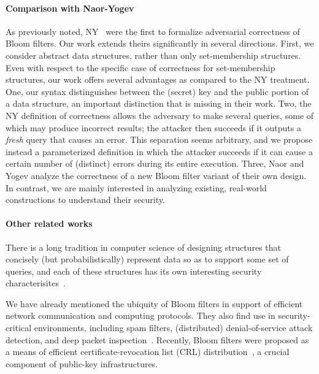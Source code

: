 \paragraph{Comparison with Naor-Yogev}
As previously noted, NY~\cite{naor2015bloom} were the first to
formalize adversarial correctness of Bloom filters.  Our work extends theirs
significantly in several directions. First, we consider abstract data
structures, rather than only set-membership structures.  Even with respect to
the specific case of correctness for set-membership structures, our work offers
several advantages as compared to the NY treatment.
%
One, our syntax distinguishes between the (secret) key and the public portion of
a data structure, an important distinction that is missing in their work.
%
Two, the NY definition of correctness allows the adversary to make
several queries, some of which may produce incorrect results; the attacker then
succeeds if it outputs a \emph{fresh} query that causes an error. This
separation seems arbitrary, and we propose instead a parameterized definition in
which the attacker succeeds if it can cause a certain number of (distinct)
errors during its entire execution.
%
Three, Naor and Yogev analyze the correctness of a new Bloom filter variant of
their own design. In contrast, we are mainly interested in analyzing existing,
real-world constructions to understand their security.

\paragraph{Other related works}
There is a long tradition in computer science of designing structures that
concisely (but probabilistically) represent data so as to support some set of
queries, and each of these structures has its own interesting security
characterisitcs~\cite{chazelle2004bloomier,cormode2005improved,DP08a,DF03,fredman1984storing,mironov2011sketching}.

We have already mentioned the ubiquity of Bloom filters in support of efficient
network communication and computing protocols.  They also find use in
security-critical environments, including spam filters, (distributed)
denial-of-service attack detection, and deep packet
inspection~\cite{tarkoma2012theory}.  Recently, Bloom filters were proposed as a
means of efficient certificate-revocation list (CRL)
distribution~\cite{larisch2017crlite}, a crucial component of public-key
infrastructures.

